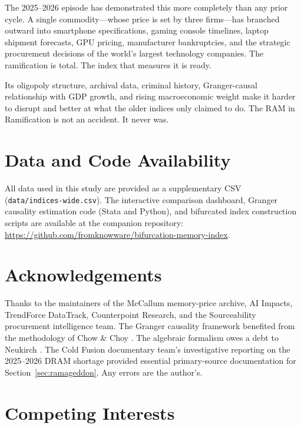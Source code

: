 \documentclass[12pt]{article}
\theoremstyle{definition}
\begin{document}
The 2025--2026 episode has demonstrated this more completely than any prior cycle. A single commodity---whose price is set by three firms---has branched outward into smartphone specifications, gaming console timelines, laptop shipment forecasts, GPU pricing, manufacturer bankruptcies, and the strategic procurement decisions of the world's largest technology companies. The ramification is total. The index that measures it is ready.

Its oligopoly structure, archival data, criminal history, Granger-causal relationship with GDP growth, and rising macroeconomic weight make it harder to disrupt and better at what the older indices only claimed to do. The RAM in Ramification is not an accident. It never was.


\section*{Data and Code Availability}

All data used in this study are provided as a supplementary CSV (\texttt{data/indices-wide.csv}). The interactive comparison dashboard, Granger causality estimation code (Stata and Python), and bifurcated index construction scripts are available at the companion repository: \url{https://github.com/fromknowware/bifurcation-memory-index}.


\section*{Acknowledgements}

Thanks to the maintainers of the McCallum memory-price archive, AI Impacts, TrendForce DataTrack, Counterpoint Research, and the Sourceability procurement intelligence team. The Granger causality framework benefited from the methodology of Chow \& Choy \cite{ChowChoy2006}. The algebraic formalism owes a debt to Neukirch \cite{Neukirch1999}. The Cold Fusion documentary team's investigative reporting on the 2025--2026 DRAM shortage provided essential primary-source documentation for Section~\ref{sec:ramageddon}. Any errors are the author's.


\section*{Competing Interests}
\end{document}
